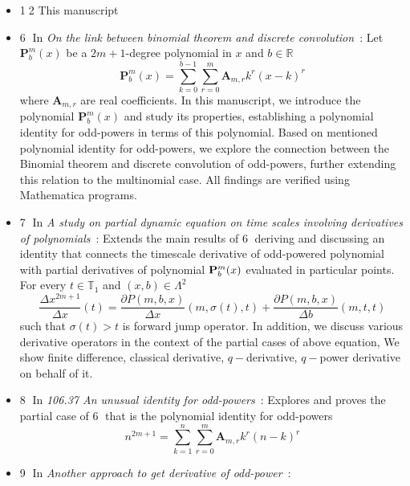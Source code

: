 \begin{itemize}
    \item {\Large \textcircled{\normalsize 12}} This manuscript
    \item {\Large \textcircled{\normalsize 6}}
    In \textit{On the link between binomial theorem and discrete convolution}~\cite{kolosov2016link}:
    Let $\mathbf{P}^{m}_{b}(x)$ be a $2m+1$-degree polynomial in $x$ and $b \in \mathbb{R}$
    \[
        \mathbf{P}^{m}_{b}(x) = \sum_{k=0}^{b-1} \sum_{r=0}^{m} \mathbf{A}_{m,r} k^r (x-k)^r
    \]
    where $\mathbf{A}_{m,r}$ are real coefficients.
    In this manuscript, we introduce the polynomial $\mathbf{P}^{m}_{b}(x)$ and study its properties,
    establishing a polynomial identity for odd-powers in terms of this polynomial.
    Based on mentioned polynomial identity for odd-powers,
    we explore the connection between the Binomial theorem and discrete convolution of odd-powers,
    further extending this relation to the multinomial case.
    All findings are verified using Mathematica programs.
    \item {\Large \textcircled{\normalsize 7}}
    In \textit{A study on partial dynamic equation on time scales involving derivatives
    of polynomials}~\cite{kolosov2016study}:
    Extends the main results of {\Large \textcircled{\normalsize 6}} deriving and discussing
    an identity that connects the timescale derivative of odd-powered polynomial
    with partial derivatives of polynomial ${\mathbf{P}}\sp{m} \sb{b}(x)$ evaluated in particular points.
    For every $t\in\mathbb{T}_1$ and $(x,b) \in \Lambda^2$
    \[
        \frac{\Delta x^{2m+1}}{\Delta x}(t) =
        \frac{\partial P(m,b,x)}{\Delta x} (m, \sigma(t), t) +
        \frac{\partial P(m,b,x)}{\Delta b} (m, t, t)
    \]
    such that $\sigma(t) > t$ is forward jump operator.
    In addition, we discuss various derivative operators in the context of the partial cases of above equation,
    We show finite difference, classical derivative, $q-$derivative, $q-$power derivative on behalf of it.
    \item {\Large \textcircled{\normalsize 8}}
    In \textit{106.37 An unusual identity for odd-powers}~\cite{kolosov2022106}:
    Explores and proves the partial case of {\Large \textcircled{\normalsize 6}}
    that is the polynomial identity for odd-powers
    \[
        n^{2m+1} = \sum_{k=1}^{n} \sum_{r=0}^{m} \mathbf{A}_{m,r} k^r (n-k)^r
    \]
    \item {\Large \textcircled{\normalsize 9}}
    In \textit{Another approach to get derivative of odd-power}~\cite{kolosov2023another}:

\end{itemize}
